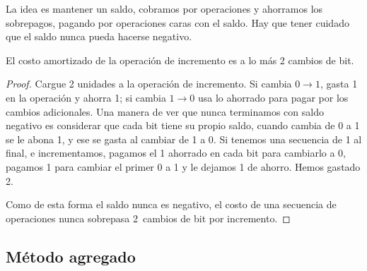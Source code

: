  La idea es mantener un saldo,
  cobramos por operaciones y ahorramos los sobrepagos,
  pagando por operaciones caras con el saldo.
  Hay que tener cuidado que el saldo nunca pueda hacerse negativo.

  \begin{proposition}
    El costo amortizado de la operación de incremento
    es a lo más \num{2} cambios de bit.
  \end{proposition}
  \begin{proof}
    Cargue \num{2} unidades a la operación de incremento.
    Si cambia \(0 \to 1\),
    gasta \num{1} en la operación y ahorra \num{1};
    si cambia \(1 \to 0\) usa lo ahorrado
    para pagar por los cambios adicionales.
    Una manera de ver que nunca terminamos con saldo negativo
    es considerar que cada bit tiene su propio saldo,
    cuando cambia de \num{0} a \num{1} se le abona \num{1},
    y ese se gasta al cambiar de \num{1} a \num{0}.
    Si tenemos una secuencia de \num{1} al final,
    e incrementamos,
    pagamos el \num{1} ahorrado en cada bit para cambiarlo a \num{0},
    pagamos \num{1} para cambiar el primer \num{0} a \num{1}
    y le dejamos \num{1} de ahorro.
    Hemos gastado \num{2}.

    Como de esta forma el saldo nunca es negativo,
    el costo de una secuencia de operaciones
    nunca sobrepasa \num{2}~cambios de bit por incremento.
  \end{proof}

\subsection{Método agregado}
\label{sec:metodo-agregado}


